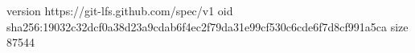 version https://git-lfs.github.com/spec/v1
oid sha256:19032c32dcf0a38d23a9cdab6f4ec2f79da31e99cf530c6cde6f7d8cf991a5ca
size 87544

